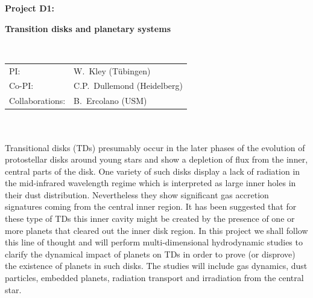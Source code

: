 \documentclass[10pt,fleqn,twoside]{article}
\begin{document}
\newpage


\setcounter{page}{1}

\centerline{\huge\bf\Tcol
%
%
%
%
%
 Project D1:}
\vspace{1em}

\centerline{\LARGE\bf\Tcol Transition disks and planetary systems}

%
%
%
%
%
\vskip1.0cm


\\
\begin{tabular}{ll}
{\textsf{PI:}}               & W.~Kley (T\"ubingen)\\
{\textsf{Co-PI:}}             & C.P.~Dullemond (Heidelberg)\\
{\textsf{Collaborations:}}     & B.~Ercolano (USM) \\
\end{tabular}


\vspace{1em}
 \\

\vspace{1em}
\\
Transitional disks (TDs) presumably occur in the later phases of the evolution of
protostellar disks around young stars and show a depletion of flux from the inner, central parts of the disk.
One variety of such disks display a lack of radiation in the mid-infrared wavelength regime which is interpreted
as large inner holes in their dust distribution.
Nevertheless they show significant gas accretion signatures coming from the central inner region. 
It has been suggested that for these type of TDs this inner cavity might be
created by the presence of one or more planets that cleared out the inner disk region.
In this project we shall follow this line of thought and will perform multi-dimensional hydrodynamic studies
to clarify the dynamical impact of planets on TDs in order to prove (or disprove) the existence of planets in such disks.
The studies will include gas dynamics, dust particles, embedded planets, radiation transport
and irradiation from the central star.

\end{document}
